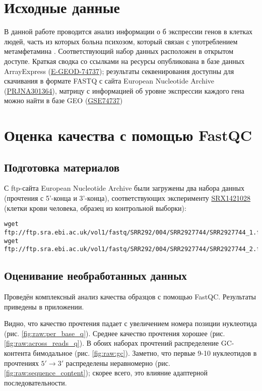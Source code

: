 \documentclass[a4paper,12pt]{article}
\begin{document}


\section{Исходные данные}

В данной работе проводится анализ информации о б экспрессии генов в клетках людей, часть из которых больна психозом, который связан с употреблением метамфетамина \cite{breen}.
Соответствующий набор данных расположен в открытом доступе. Краткая сводка со ссылками на ресурсы опубликована в базе данных ArrayExpress (\href{https://www.ebi.ac.uk/arrayexpress/experiments/E-GEOD-74737/}{E-GEOD-74737}); результаты секвенирования доступны для скачивания в формате FASTQ с сайта European Nucleotide Archive (\href{https://www.ebi.ac.uk/ena/browser/view/PRJNA301364}{PRJNA301364}), матрицу с информацией об уровне экспрессии каждого гена можно найти в базе GEO (\href{https://www.ncbi.nlm.nih.gov/geo/query/acc.cgi?acc=GSE74737}{GSE74737})

\section{Оценка качества с помощью FastQC}

\subsection{Подготовка материалов}

С ftp-сайта European Nucleotide Archive были загружены два набора данных (прочтения с 5'-конца и 3'-конца), соответствующих эксперименту \href{https://www.ebi.ac.uk/ena/browser/view/SRX1421028}{SRX1421028} (клетки крови человека, образец из контрольной выборки):

\begin{lstlisting}
wget ftp://ftp.sra.ebi.ac.uk/vol1/fastq/SRR292/004/SRR2927744/SRR2927744_1.fastq.gz
wget ftp://ftp.sra.ebi.ac.uk/vol1/fastq/SRR292/004/SRR2927744/SRR2927744_2.fastq.gz
\end{lstlisting}

\subsection{Оценивание необработанных данных}

Проведён комплексный анализ качества образцов с помощью FastQC.
Результаты приведены в приложении.

Видно, что качество прочтения падает с увеличением номера позиции нуклеотида (рис. \ref{fig:raw:per_base_q}).
Среднее качество прочтения хорошее (рис. \ref{fig:raw:across_reads_q}).
В обоих наборах прочтений распределение GC-контента бимодальное (рис. \ref{fig:raw:gc}).
Заметно, что первые 9-10 нуклеотидов в прочтениях $ 5' \to 3'$ распределены неравномерно (рис. \ref{fig:raw:sequence_content}); скорее всего, это влияние адаптерной последовательности.
\end{document}
